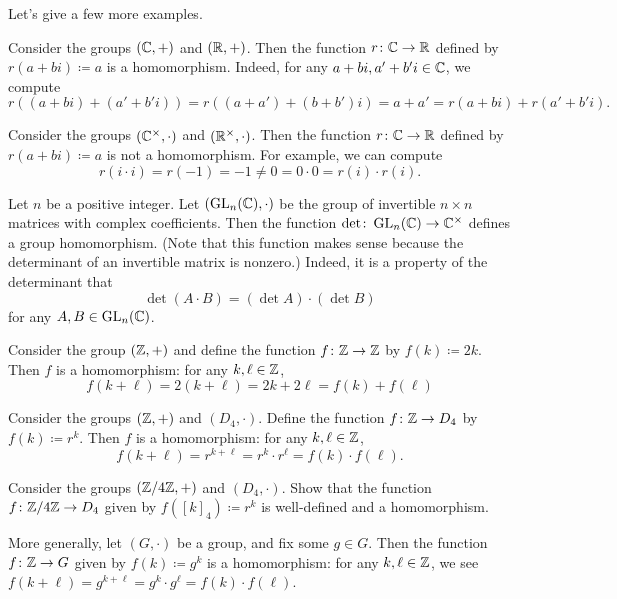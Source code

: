 \documentclass[../main.tex]{subfiles}
\begin{document}
Let's give a few more examples.
\begin{example} \label{ex:real-part-hom}
    Consider the groups $(\mathbb C,+)$ and $(\mathbb R,+)$. Then the function $r\colon\mathbb C\to\mathbb R$ defined by $r(a+bi)\coloneqq a$ is a homomorphism. Indeed, for any $a+bi,a'+b'i\in\mathbb C$, we compute
    \[r((a+bi)+(a'+b'i))=r((a+a')+(b+b')i)=a+a'=r(a+bi)+r(a'+b'i).\]
\end{example}
\begin{nex}
    Consider the groups $(\mathbb C^\times,\cdot)$ and $(\mathbb R^\times,\cdot)$. Then the function $r\colon\mathbb C\to\mathbb R$ defined by $r(a+bi)\coloneqq a$ is not a homomorphism. For example, we can compute
    \[r(i\cdot i)=r(-1)=-1\ne0=0\cdot0=r(i)\cdot r(i).\]
\end{nex}
\begin{example} \label{ex:det-hom}
    Let $n$ be a positive integer. Let $(\operatorname{GL}_n(\mathbb C),\cdot)$ be the group of invertible $n\times n$ matrices with complex coefficients. Then the function $\det\colon\operatorname{GL}_n(\mathbb C)\to\mathbb C^\times$ defines a group homomorphism. (Note that this function makes sense because the determinant of an invertible matrix is nonzero.) Indeed, it is a property of the determinant that
    \[\det(A\cdot B)=(\det A)\cdot(\det B)\]
    for any $A,B\in\operatorname{GL}_n(\mathbb C)$.
\end{example}
\begin{example} \label{ex:double-z-hom}
    Consider the group $(\mathbb Z,+)$ and define the function $f\colon\mathbb Z\to\mathbb Z$ by $f(k)\coloneqq2k$. Then $f$ is a homomorphism: for any $k,\ell\in\mathbb Z$,
    \[f(k+\ell)=2(k+\ell)=2k+2\ell=f(k)+f(\ell)\]
\end{example}
\begin{example} \label{ex:z-to-d4}
    Consider the groups $(\mathbb Z,+)$ and $(D_4,\cdot)$. Define the function $f\colon\mathbb Z\to D_4$ by $f(k)\coloneqq r^k$. Then $f$ is a homomorphism: for any $k,\ell\in\mathbb Z$,
    \[f(k+\ell)=r^{k+\ell}=r^k\cdot r^\ell=f(k)\cdot f(\ell).\]
\end{example}
\begin{exe}
    Consider the groups $(\mathbb Z/4\mathbb Z,+)$ and $(D_4,\cdot)$. Show that the function $f\colon\mathbb Z/4\mathbb Z\to D_4$ given by $f([k]_4)\coloneqq r^k$ is well-defined and a homomorphism.
\end{exe}
\begin{example} \label{ex:cyclic-subgroup-hom}
    More generally, let $(G,\cdot)$ be a group, and fix some $g\in G$. Then the function $f\colon\mathbb Z\to G$ given by $f(k)\coloneqq g^k$ is a homomorphism: for any $k,\ell\in\mathbb Z$, we see $f(k+\ell)=g^{k+\ell}=g^k\cdot g^\ell=f(k)\cdot f(\ell)$.
\end{example}
\end{document}
